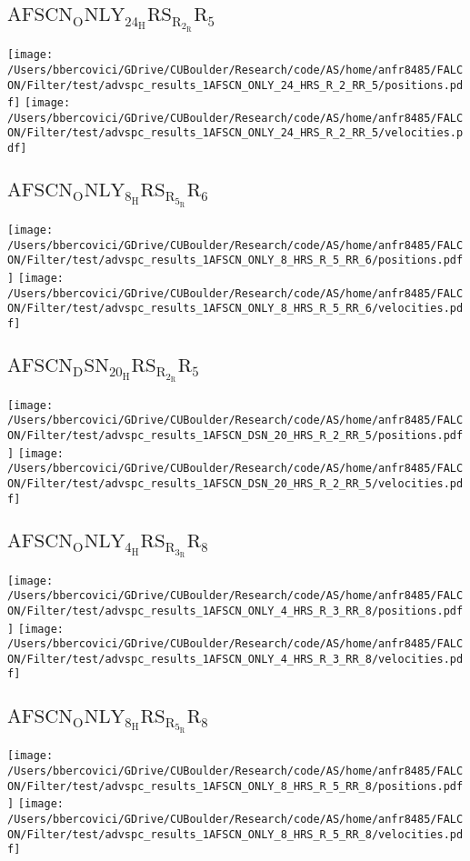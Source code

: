 \subsection{$\mathrm{AFSCN_ONLY_24_HRS_R_2_RR_5}$}
\texttt{[image: /Users/bbercovici/GDrive/CUBoulder/Research/code/AS/home/anfr8485/FALCON/Filter/test/advspc\_results\_1AFSCN\_ONLY\_24\_HRS\_R\_2\_RR\_5/positions.pdf]}
\texttt{[image: /Users/bbercovici/GDrive/CUBoulder/Research/code/AS/home/anfr8485/FALCON/Filter/test/advspc\_results\_1AFSCN\_ONLY\_24\_HRS\_R\_2\_RR\_5/velocities.pdf]}
\subsection{$\mathrm{AFSCN_ONLY_8_HRS_R_5_RR_6}$}
\texttt{[image: /Users/bbercovici/GDrive/CUBoulder/Research/code/AS/home/anfr8485/FALCON/Filter/test/advspc\_results\_1AFSCN\_ONLY\_8\_HRS\_R\_5\_RR\_6/positions.pdf]}
\texttt{[image: /Users/bbercovici/GDrive/CUBoulder/Research/code/AS/home/anfr8485/FALCON/Filter/test/advspc\_results\_1AFSCN\_ONLY\_8\_HRS\_R\_5\_RR\_6/velocities.pdf]}
\subsection{$\mathrm{AFSCN_DSN_20_HRS_R_2_RR_5}$}
\texttt{[image: /Users/bbercovici/GDrive/CUBoulder/Research/code/AS/home/anfr8485/FALCON/Filter/test/advspc\_results\_1AFSCN\_DSN\_20\_HRS\_R\_2\_RR\_5/positions.pdf]}
\texttt{[image: /Users/bbercovici/GDrive/CUBoulder/Research/code/AS/home/anfr8485/FALCON/Filter/test/advspc\_results\_1AFSCN\_DSN\_20\_HRS\_R\_2\_RR\_5/velocities.pdf]}
\subsection{$\mathrm{AFSCN_ONLY_4_HRS_R_3_RR_8}$}
\texttt{[image: /Users/bbercovici/GDrive/CUBoulder/Research/code/AS/home/anfr8485/FALCON/Filter/test/advspc\_results\_1AFSCN\_ONLY\_4\_HRS\_R\_3\_RR\_8/positions.pdf]}
\texttt{[image: /Users/bbercovici/GDrive/CUBoulder/Research/code/AS/home/anfr8485/FALCON/Filter/test/advspc\_results\_1AFSCN\_ONLY\_4\_HRS\_R\_3\_RR\_8/velocities.pdf]}
\subsection{$\mathrm{AFSCN_ONLY_8_HRS_R_5_RR_8}$}
\texttt{[image: /Users/bbercovici/GDrive/CUBoulder/Research/code/AS/home/anfr8485/FALCON/Filter/test/advspc\_results\_1AFSCN\_ONLY\_8\_HRS\_R\_5\_RR\_8/positions.pdf]}
\texttt{[image: /Users/bbercovici/GDrive/CUBoulder/Research/code/AS/home/anfr8485/FALCON/Filter/test/advspc\_results\_1AFSCN\_ONLY\_8\_HRS\_R\_5\_RR\_8/velocities.pdf]}

